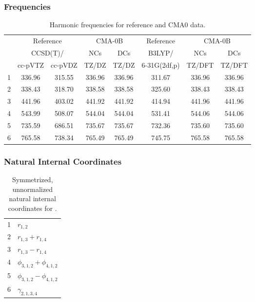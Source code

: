 \documentclass[10pt,oneside]{article}
\begin{document}
\clearpage

\subsubsection*{Frequencies}
\begin{table}[h!]
\centering
\caption{Harmonic frequencies for reference and CMA0 data.}
\begin{tabular}{cccccccc}
\toprule
{} & \multicolumn{2}{c}{Reference} & \multicolumn{2}{c}{CMA-0B} &    Reference & \multicolumn{2}{c}{CMA-0B} \\
{} & \multicolumn{2}{c}{CCSD(T)/} &    NCs &    DCs &       B3LYP/ &    NCs &    DCs \\
{} &   cc-pVTZ & cc-pVDZ &  TZ/DZ &  TZ/DZ & 6-31G(2df,p) & TZ/DFT & TZ/DFT \\
\midrule
1 &    336.96 &  315.55 & 336.96 & 336.96 &       311.67 & 336.96 & 336.96 \\
2 &    338.43 &  318.70 & 338.58 & 338.58 &       325.60 & 338.43 & 338.43 \\
3 &    441.96 &  403.02 & 441.92 & 441.92 &       414.94 & 441.96 & 441.96 \\
4 &    543.99 &  508.07 & 544.04 & 544.04 &       531.41 & 544.06 & 544.06 \\
5 &    735.59 &  686.51 & 735.67 & 735.67 &       732.36 & 735.60 & 735.60 \\
6 &    765.58 &  738.34 & 765.49 & 765.49 &       745.75 & 765.58 & 765.58 \\
\bottomrule
\end{tabular}
\end{table}

\clearpage

\subsubsection*{Natural Internal Coordinates}
\begin{table}[h!]
\centering
\caption{Symmetrized, unnormalized natural internal coordinates for .}
\small
\begin{tabular}{ll}
  1   & $r_{1,2}$ \\
  2   & $r_{1,3} + r_{1,4}$ \\
  3   & $r_{1,3} - r_{1,4}$ \\
  4   & $\phi_{3,1,2} + \phi_{4,1,2}$ \\
  5   & $\phi_{3,1,2} - \phi_{4,1,2}$ \\
  6   & $\gamma_{2,1,3,4}$ \\
\end{tabular}
\end{table}
\end{document}
